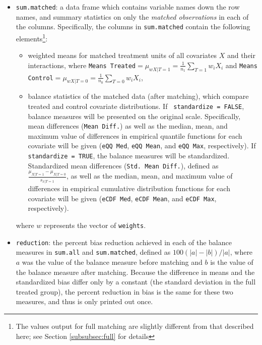 \begin{itemize}
\item \texttt{sum.matched}: a data frame which contains variable names
  down the row names, and summary statistics on only the \emph{matched
    observations} in each of the columns.  Specifically, the columns
  in \texttt{sum.matched} contain the following elements\footnote{The
    values output for full matching are slightly different from that
    described here; see Section \ref{subsubsec:full} for details}:
  \begin{itemize}
  \item weighted means for matched treatment units of all covariates
    $X$ and their interactions, where \texttt{Means Treated}$=
    \mu_{wX|T=1} = \frac{1}{n_1} \sum_{T=1} w_iX_i$ and \texttt{Means
      Control}$=\mu_{wX|T=0} = \frac{1}{n_0} \sum_{T=0} w_iX_i$,
  \item balance statistics of the matched data (after matching), which
    compare treated and control covariate distributions. If {\tt
      standardize = FALSE}, balance measures will be presented on the
    original scale. Specifically, mean differences (\texttt{Mean
      Diff.}) as well as the median, mean, and maximum value of
    differences in empirical quantile functions for each covariate
    will be given (\texttt{eQQ Med}, \texttt{eQQ Mean}, and
    \texttt{eQQ Max}, respectively). If {\tt standardize = TRUE}, the
    balance measures will be standardized.  Standardized mean
    differences (\texttt{Std. Mean Diff.}), defined as
    $\frac{\mu_{X|T=1} - \mu_{X|T=0}}{s_{x|T=1}}$, as well as the
    median, mean, and maximum value of differences in empirical
    cumulative distribution functions for each covariate will be given
    (\texttt{eCDF Med}, \texttt{eCDF Mean}, and \texttt{eCDF Max},
    respectively).
  \end{itemize}
  where $w$ represents the vector of \texttt{weights}.
  
\item \texttt{reduction}: the percent bias reduction achieved in each
  of the balance measures in \texttt{sum.all} and
  \texttt{sum.matched}, defined as $100(|a|-|b|)/|a|$, where $a$ was
  the value of the balance measure before matching and $b$ is the
  value of the balance measure after matching.  Because the difference
  in means and the standardized bias differ only by a constant (the
  standard deviation in the full treated group), the percent reduction
  in bias is the same for these two measures, and thus is only printed
  out once.
  

\end{itemize}
